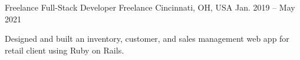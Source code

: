 \begin{cventries}
	\cventry
	{Freelance Full-Stack Developer} %
	{Freelance} %
	{Cincinnati, OH, USA} %
	{Jan. 2019 -- May 2021} %
	{
		\begin{cvitems}
			\item Designed and built an inventory, customer, and sales management web
			app for retail client using Ruby on Rails.
		\end{cvitems}
	}

\end{cventries}
